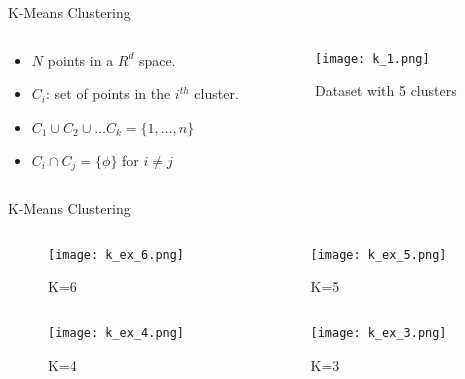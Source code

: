 \documentclass{beamer}
\begin{document}
\begin{frame}{K-Means Clustering}
\begin{columns}[T]
  \begin{column}{0.5\textwidth}
  \begin{itemize}
\item $N$ points in a $R^d$ space.
\item $C_i$: set of points in the $i^{th}$ cluster.
\item $C_1 \cup C_2 \cup \ldots C_k = \{1, \ldots , n\}$
\item $C_i \cap C_j = \{\phi \}$ for $i\neq j$
\end{itemize}
  \end{column}
  \begin{column}{0.5\textwidth}
\begin{figure}[htp]
    \centering
    \texttt{[image: k\_1.png]}
    \caption{Dataset with 5 clusters}
\end{figure}  
  \end{column}
\end{columns}
\end{frame}

\begin{frame}{K-Means Clustering}
\begin{columns}[T]
  \begin{column}{0.5\textwidth}
    \begin{figure}
      \texttt{[image: k\_ex\_6.png]}
      \vspace*{-0.3cm}
      \caption{K=6}
    \end{figure}
  \end{column}
  \begin{column}{0.5\textwidth}
    \begin{figure}
      \texttt{[image: k\_ex\_5.png]}
      \vspace*{-0.3cm}
      \caption{K=5}
    \end{figure}
  \end{column}
\end{columns}
\vspace*{-0.5cm}
\begin{columns}[T]
  \begin{column}{0.5\textwidth}
    \begin{figure}
      \texttt{[image: k\_ex\_4.png]}
      \vspace*{-0.3cm}
      \caption{K=4}
    \end{figure}
  \end{column}
  \begin{column}{0.5\textwidth}
    \begin{figure}
      \texttt{[image: k\_ex\_3.png]}
      \vspace*{-0.3cm}
      \caption{K=3}
    \end{figure}
  \end{column}
\end{columns}
\end{frame}
\end{document}
